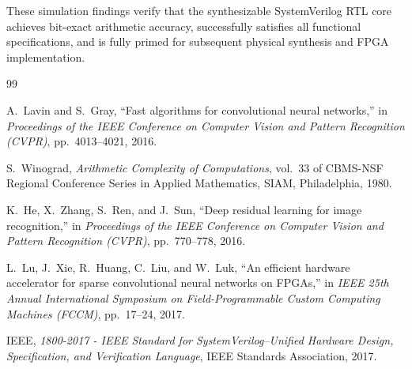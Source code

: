 \documentclass[12pt,a4paper]{article}
\begin{document}
These simulation findings verify that the synthesizable SystemVerilog RTL core achieves bit-exact arithmetic accuracy, successfully satisfies all functional specifications, and is fully primed for subsequent physical synthesis and FPGA implementation.

\newpage
\begin{thebibliography}{99}

    A.~Lavin and S.~Gray, ``Fast algorithms for convolutional neural networks,'' in \textit{Proceedings of the IEEE Conference on Computer Vision and Pattern Recognition (CVPR)}, pp.~4013--4021, 2016.

    S.~Winograd, \textit{Arithmetic Complexity of Computations}, vol.~33 of CBMS-NSF Regional Conference Series in Applied Mathematics, SIAM, Philadelphia, 1980.

    K.~He, X.~Zhang, S.~Ren, and J.~Sun, ``Deep residual learning for image recognition,'' in \textit{Proceedings of the IEEE Conference on Computer Vision and Pattern Recognition (CVPR)}, pp.~770--778, 2016.

    L.~Lu, J.~Xie, R.~Huang, C.~Liu, and W.~Luk, ``An efficient hardware accelerator for sparse convolutional neural networks on FPGAs,'' in \textit{IEEE 25th Annual International Symposium on Field-Programmable Custom Computing Machines (FCCM)}, pp.~17--24, 2017.

    IEEE, \textit{1800-2017 - IEEE Standard for SystemVerilog--Unified Hardware Design, Specification, and Verification Language}, IEEE Standards Association, 2017.

\end{thebibliography}
\end{document}

